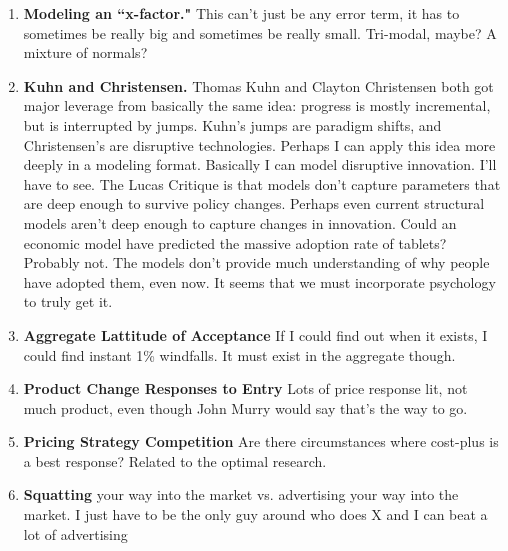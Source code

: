 \documentclass[paper=a4, fontsize=11pt]{scrartcl} %
\numberwithin{equation}{section} %
\numberwithin{figure}{section} %
\numberwithin{table}{section} %
\begin{document}
\begin{enumerate}
\item \textbf{Modeling an ``x-factor."}  This can't just be any error term, it has to sometimes be really big and sometimes be really small.  Tri-modal, maybe?  A mixture of normals?

\item \textbf{Kuhn and Christensen.}  Thomas Kuhn and Clayton Christensen both got major leverage from basically the same idea: progress is mostly incremental, but is interrupted by jumps.  Kuhn's jumps are paradigm shifts, and Christensen's are disruptive technologies.  Perhaps I can apply this idea more deeply in a modeling format.  Basically I can model disruptive innovation.  I'll have to see.  The Lucas Critique is that models don't capture parameters that are deep enough to survive policy changes.  Perhaps even current structural models aren't deep enough to capture changes in innovation.  Could an economic model have predicted the massive adoption rate of tablets?  Probably not.  The models don't provide much understanding of why people have adopted them, even now.  It seems that we must incorporate psychology to truly get it.  



\item \textbf{Aggregate Lattitude of Acceptance}  If I could find out when it exists, I could find instant 1\% windfalls.  It must exist in the aggregate though. 

\item \textbf{Product Change Responses to Entry} Lots of price response lit, not much product, even though John Murry would say that's the way to go.

\item \textbf{Pricing Strategy Competition}  Are there circumstances where cost-plus is a best response?  Related to the optimal research.  

\item \textbf{Squatting} your way into the market vs. advertising your way into the market.  I just have to be the only guy around who does X and I can beat a lot of advertising


\end{enumerate}
\end{document}
